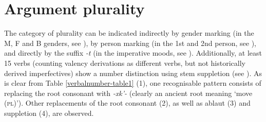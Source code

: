 \pagebreak
\section{Argument plurality} \label{verbalnumber}
The category of plurality can be indicated indirectly by gender marking (in the M, F and B genders, see ), by person marking (in the 1st and 2nd person, see ), and directly by the suffix \textit{-t} (in the imperative moods, see ). Additionally, at least 15 verbs (counting valency derivations as different verbs, but not historically derived imperfectives) show a number distinction using stem suppletion (see \cites[150]{desheriev53}[178]{holiskygagua}). As is clear from Table \ref{verbalnumber-table1} (1), one recognisable pattern consists of replacing the root consonant with \textit{-xk'-} (clearly an ancient root meaning `move (\textsc{pl})'). Other replacements of the root consonant (2), as well as ablaut (3) and suppletion (4), are observed.

